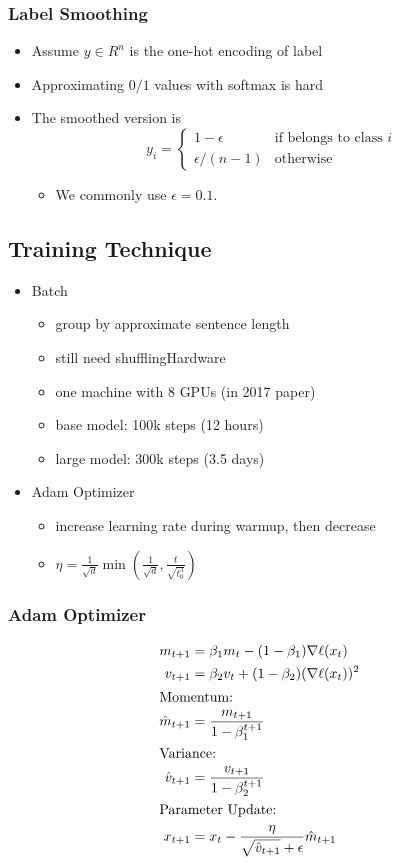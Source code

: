 \documentclass[10pt]{article}
\begin{document}
\subsubsection*{Label Smoothing}
\begin{itemize}
	\item Assume $y \in R^n$ is the one-hot encoding of label
	\item Approximating $0/1$ values with softmax is hard
	\item The smoothed version is 
    \[y_i = \begin{cases} 1 - \epsilon & \text{if belongs to class $i$}\\ \epsilon / (n - 1) & \text{otherwise} \end{cases}\]
    \begin{itemize}
	    \item We commonly use $\epsilon = 0.1$.
    \end{itemize}
\end{itemize}

\subsection*{Training Technique}
\begin{itemize}
	\item Batch
	\begin{itemize}
	    \item group by approximate sentence length
	    \item still need shufflingHardware
	    \item one machine with 8 GPUs (in 2017 paper)
	    \item base model: 100k steps (12 hours)
	    \item large model: 300k steps (3.5 days)
    \end{itemize}
	\item Adam Optimizer
	\begin{itemize}
	    \item increase learning rate during warmup, then decrease
	    \item $\eta = \frac{1}{\sqrt{d}} \min \left(\frac{1}{\sqrt{d}}, \frac{t}{\sqrt{t_0^3}}\right)$
    \end{itemize}
\end{itemize}

\subsubsection*{Adam Optimizer}
\begin{align*}
m_{t + 1} &= \beta_1 m_t - (1 - \beta_1) \nabla \ell(x_t)\\
v_{t + 1} &= \beta_2 v_t + (1 - \beta_2) (\nabla \ell(x_t))^2 \\
\intertext{Momentum:}
\hat{m}_{t + 1} &= \frac{m_{t + 1}}{1 - \beta_1^{t + 1}} \\
\intertext{Variance:}
\hat{v}_{t + 1} &= \frac{v_{t + 1}}{1 - \beta_2^{t + 1}} \\
\intertext{Parameter Update:}
x_{t + 1} &= x_t - \frac{\eta}{\sqrt{\hat{v}_{t + 1}} + \epsilon} \hat{m}_{t + 1}
\end{align*}
\end{document}
